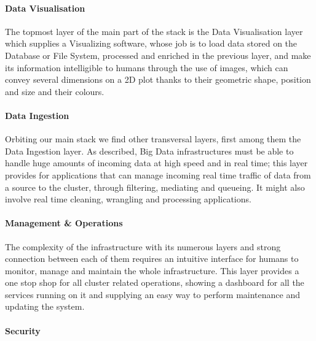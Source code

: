 \paragraph{Data Visualisation}

The topmost layer of the main part of the stack is the Data Visualisation layer which supplies a Visualizing software, whose job is to load data stored on the Database or File System, processed and enriched in the previous layer, and make its information intelligible to humans through the use of images, which can convey several dimensions on a 2D plot thanks to their geometric shape, position and size and their colours.

\paragraph{Data Ingestion}

Orbiting our main stack we find other transversal layers, first among them the Data Ingestion layer.\newline
As described, Big Data infrastructures must be able to handle huge amounts of incoming data at high speed and in real time; this layer provides for applications that can manage incoming real time traffic of data from a source to the cluster, through filtering, mediating and queueing. It might also involve real time cleaning, wrangling and processing applications.

\paragraph{Management \& Operations}

The complexity of the infrastructure with its numerous layers and strong connection between each of them requires an intuitive interface for humans to monitor, manage and maintain the whole infrastructure.\newline
This layer provides a one stop shop for all cluster related operations, showing a dashboard for all the services running on it and supplying an easy way to perform maintenance and updating the system.

\paragraph{Security}

